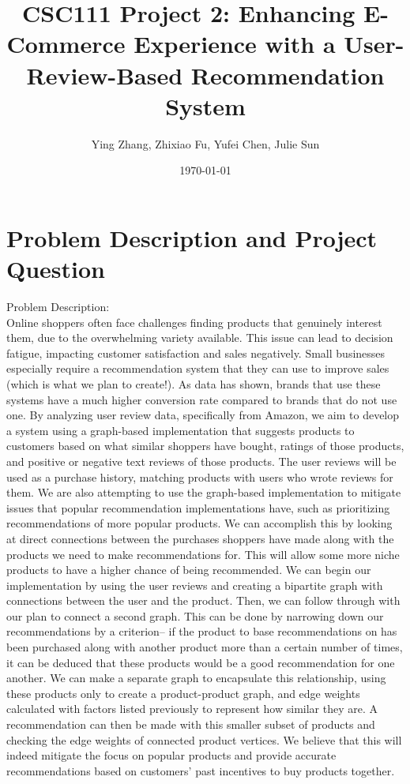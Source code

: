 \documentclass[fontsize=11pt]{article}
\title{CSC111 Project 2: Enhancing E-Commerce Experience with a User-Review-Based Recommendation System }
\author{Ying Zhang, Zhixiao Fu, Yufei Chen, Julie Sun}
\date{\today}
\begin{document}
\maketitle

\section*{Problem Description and Project Question}
Problem Description: \\
Online shoppers often face challenges finding products that genuinely interest them, due to the overwhelming variety available. This issue can lead to decision fatigue, impacting customer satisfaction and sales negatively. Small businesses especially require a recommendation system that they can use to improve sales (which is what we plan to create!). As data has shown, brands that use these systems have a much higher conversion rate compared to brands that do not use one. By analyzing user review data, specifically from Amazon, we aim to develop a system using a graph-based implementation that suggests products to customers based on what similar shoppers have bought, ratings of those products, and positive or negative text reviews of those products. The user reviews will be used as a purchase history, matching products with users who wrote reviews for them. We are also attempting to use the graph-based implementation to mitigate issues that popular recommendation implementations have, such as prioritizing recommendations of more popular products. We can accomplish this by looking at direct connections between the purchases shoppers have made along with the products we need to make recommendations for. This will allow some more niche products to have a higher chance of being recommended. We can begin our implementation by using the user reviews and creating a bipartite graph with connections between the user and the product. Then, we can follow through with our plan to connect a second graph. This can be done by narrowing down our recommendations by a criterion-- if the product to base recommendations on has been purchased along with another product more than a certain number of times, it can be deduced that these products would be a good recommendation for one another. We can make a separate graph to encapsulate this relationship, using these products only to create a product-product graph, and edge weights calculated with factors listed previously to represent how similar they are. A recommendation can then be made with this smaller subset of products and checking the edge weights of connected product vertices. We believe that this will indeed mitigate the focus on popular products and provide accurate recommendations based on customers' past incentives to buy products together.
\end{document}

